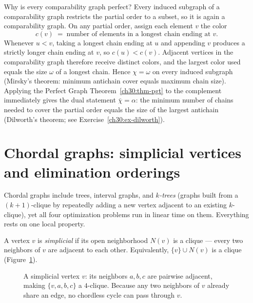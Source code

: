 Why is every comparability graph perfect? Every induced subgraph of a comparability graph restricts the partial order to a subset, so it is again a comparability graph. On any partial order, assign each element $v$ the color
\[
  c(v) \;=\; \text{number of elements in a longest chain ending at } v.
\]
Whenever $u<v$, taking a longest chain ending at $u$ and appending $v$ produces a strictly longer chain ending at $v$, so $c(u)<c(v)$. Adjacent vertices in the comparability graph therefore receive distinct colors, and the largest color used equals the size $\omega$ of a longest chain. Hence $\chi=\omega$ on every induced subgraph (Mirsky's theorem: minimum antichain cover equals maximum chain size). Applying the Perfect Graph Theorem~\ref{ch30:thm-pgt} to the complement immediately gives the dual statement $\bar\chi=\alpha$: the minimum number of chains needed to cover the partial order equals the size of the largest antichain (Dilworth's theorem; see Exercise~\ref{ch30:ex-dilworth}).

\section{Chordal graphs: simplicial vertices and elimination orderings}\label{ch30:sec-chordal}

Chordal graphs include trees, interval graphs, and \emph{$k$-trees} (graphs built from a $(k+1)$-clique by repeatedly adding a new vertex adjacent to an existing $k$-clique), yet all four optimization problems run in linear time on them. Everything rests on one local property.

\begin{definition}\label{ch30:def-simplicial}
A vertex $v$ is \emph{simplicial} if its open neighborhood $N(v)$ is a clique --- every two neighbors of $v$ are adjacent to each other. Equivalently, $\{v\}\cup N(v)$ is a clique (Figure~\ref{ch30:fig-simplicial}).
\end{definition}

\begin{figure}[htbp]
\centering
{}
\caption{A simplicial vertex $v$: its neighbors $a,b,c$ are pairwise adjacent, making $\{v,a,b,c\}$ a $4$-clique. Because any two neighbors of $v$ already share an edge, no chordless cycle can pass through $v$.}
\label{ch30:fig-simplicial}
\end{figure}

